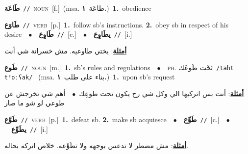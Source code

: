 \documentclass[10pt,a4paper,twoside]{article} %
\begin{document}
\begin{multicols}{2}
{\setlength\topsep{0pt}\textbf{\foreignlanguage{arabic}{طَاعَة}}\ {\color{gray}\texttt{//}\color{black}}\ \textsc{noun}\ [f.]\ \color{gray}(msa. \foreignlanguage{arabic}{طاعَة}~\foreignlanguage{arabic}{\textbf{١.}})\color{black}\ \textbf{1.}~obedience\ } \vspace{2mm}

{\setlength\topsep{0pt}\textbf{\foreignlanguage{arabic}{طَاوَع}}\ {\color{gray}\texttt{//}\color{black}}\ \textsc{verb}\ [p.]\ \textbf{1.}~follow sb's instructions.  \textbf{2.}~obey sb in respect of his desire\ \ $\bullet$\ \ \setlength\topsep{0pt}\textbf{\foreignlanguage{arabic}{طَاوِع}}\ {\color{gray}\texttt{//}\color{black}}\ [c.]\ \ $\bullet$\ \ \setlength\topsep{0pt}\textbf{\foreignlanguage{arabic}{يطَاوِع}}\ {\color{gray}\texttt{//}\color{black}}\ [i.]\  \begin{flushright}\color{gray}\foreignlanguage{arabic}{\textbf{\underline{\foreignlanguage{arabic}{أمثلة}}}: يختي طاوعيه. مش خسرانة شي أنت}\end{flushright}\color{black}} \vspace{2mm}

{\setlength\topsep{0pt}\textbf{\foreignlanguage{arabic}{طَوع}}\ {\color{gray}\texttt{//}\color{black}}\ \textsc{noun}\ [m.]\ \textbf{1.}~sb's rules and regulations\ \ $\bullet$\ \ \textsc{ph.} \color{gray} \foreignlanguage{arabic}{تَحْت طَوعَك}\color{black}\ {\color{gray}\texttt{/{\sffamily taħt tˤoːʕak}/}\color{black}}\ \color{gray} (msa. \foreignlanguage{arabic}{بناء على طلب}~\foreignlanguage{arabic}{\textbf{١.}})\color{black}\ \textbf{1.}~upon sb's request\  \begin{flushright}\color{gray}\foreignlanguage{arabic}{\textbf{\underline{\foreignlanguage{arabic}{أمثلة}}}: أنت بس اتركيها الي وكل شي رح يكون تحت طوعِك\ $\bullet$\ \  أهم شي تخرجش عن طوعي لو شو ما صار}\end{flushright}\color{black}} \vspace{2mm}

{\setlength\topsep{0pt}\textbf{\foreignlanguage{arabic}{طَوَّع}}\ {\color{gray}\texttt{//}\color{black}}\ \textsc{verb}\ [p.]\ \textbf{1.}~defeat sb.  \textbf{2.}~make sb acquiesce\ \ $\bullet$\ \ \setlength\topsep{0pt}\textbf{\foreignlanguage{arabic}{طَوِّع}}\ {\color{gray}\texttt{//}\color{black}}\ [c.]\ \ $\bullet$\ \ \setlength\topsep{0pt}\textbf{\foreignlanguage{arabic}{يطَوِّع}}\ {\color{gray}\texttt{//}\color{black}}\ [i.]\  \begin{flushright}\color{gray}\foreignlanguage{arabic}{\textbf{\underline{\foreignlanguage{arabic}{أمثلة}}}: مش مضطر لا تدعس بوجهه ولا تطَوِّعه. خلاص اتركه بحاله.}\end{flushright}\color{black}} \vspace{2mm}


\end{multicols}
\end{document}
